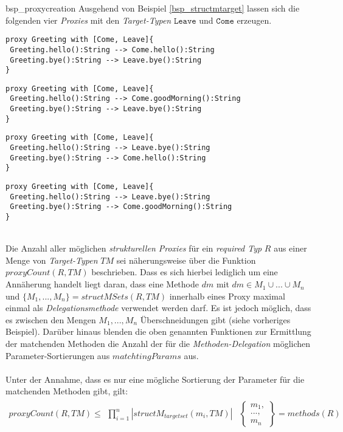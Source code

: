\begin{example}{bsp_proxycreation}
Ausgehend von Beispiel \ref{bsp_structmtarget} lassen sich die folgenden vier \emph{Proxies} mit den \emph{Target-Typen} $\texttt{Leave}$ und $\texttt{Come}$ erzeugen.
\begin{lstlisting}[style = dsl]
proxy Greeting with [Come, Leave]{
 Greeting.hello():String --> Come.hello():String
 Greeting.bye():String --> Leave.bye():String
}
\end{lstlisting}
\begin{lstlisting}[style = dsl]
proxy Greeting with [Come, Leave]{
 Greeting.hello():String --> Come.goodMorning():String
 Greeting.bye():String --> Leave.bye():String
}
\end{lstlisting}
\begin{lstlisting}[style = dsl]
proxy Greeting with [Come, Leave]{
 Greeting.hello():String --> Leave.bye():String
 Greeting.bye():String --> Come.hello():String
}
\end{lstlisting}
\begin{lstlisting}[style = dsl]
proxy Greeting with [Come, Leave]{
 Greeting.hello():String --> Leave.bye():String
 Greeting.bye():String --> Come.goodMorning():String
}
\end{lstlisting}
\end{example}
\\
Die Anzahl aller möglichen \emph{strukturellen Proxies} für ein \emph{required Typ} $R$ aus einer Menge von \emph{Target-Typen} $\mathit{TM}$ sei näherungsweise über die Funktion $\mathit{proxyCount(R,\mathit{TM})}$ beschrieben. Dass es sich hierbei lediglich um eine Annäherung handelt liegt daran, dass eine Methode $\mathit{dm}$ mit $\mathit{dm} \in M_1 \cup ... \cup M_n$ und $\{M_1,...,M_n\} = \mathit{structMSets(R,TM)}$ innerhalb eines Proxy maximal einmal als \emph{Delegationsmethode} verwendet werden darf. Es ist jedoch möglich, dass es zwischen den Mengen 
$M_1,...,M_n$ Überschneidungen gibt (siehe vorheriges Beispiel). Darüber hinaus blenden die oben genannten Funktionen zur Ermittlung der matchenden Methoden die Anzahl der für die \emph{Methoden-Delegation} möglichen Parameter-Sortierungen aus $\mathit{matchtingParams}$ aus.
\\\\
Unter der Annahme, dass es nur eine mögliche Sortierung der Parameter für die matchenden Methoden gibt, gilt:
\begin{gather*}
\mathit{proxyCount(R,TM)} \leq 
\begin{array}{l|l}
\prod\limits_{i=1}^{n}|\mathit{structM_{targetset}(m_i, TM)}|
&
\left\{
\begin{array}{l}
m_1,\\
...,\\
m_n
\end{array}
\right\}
= \mathit{methods(R)}
\end{array}
\end{gather*}
